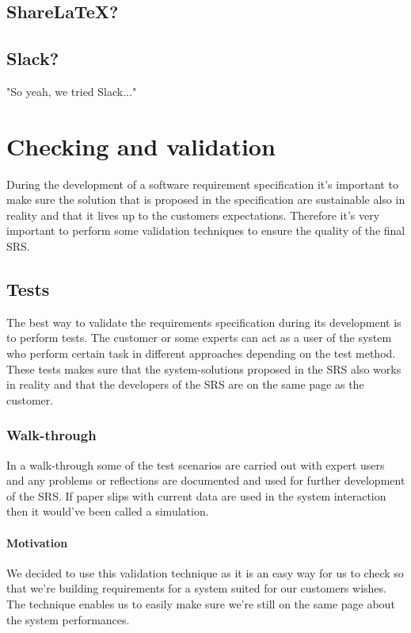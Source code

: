 \documentclass[10pt]{article}
\begin{document}
\subsection{ShareLaTeX?}

\subsection{Slack?}
"So yeah, we tried Slack..."

\section{Checking and validation}
\noindent
During the development of a software requirement specification it's important to make sure the solution that is proposed in the specification are sustainable also in reality and that it lives up to the customers expectations. Therefore it's very important to perform some validation techniques to ensure the quality of the final SRS.
\subsection{Tests}
The best way to validate the requirements specification during its development is to perform tests. The customer or some experts can act as a user of the system who perform certain task in different approaches depending on the test method. These tests makes sure that the system-solutions proposed in the SRS also works in reality and that the developers of the SRS are on the same page as the customer.

\subsubsection{Walk-through}
In a walk-through some of the test scenarios are carried out with expert users and any problems or reflections are documented and used for further development of the SRS. If paper slips with current data are used in the system interaction then it would've been called a simulation.

\paragraph{Motivation}
\hfill \break
We decided to use this validation technique as it is an easy way for us to check so that we're building requirements for a system suited for our customers wishes. The technique enables us to easily make sure we're still on the same page about the system performances.
\end{document}
